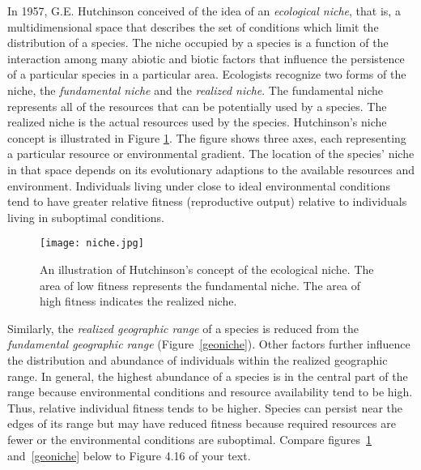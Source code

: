 \documentclass[11pt, hidelinks]{article}
\begin{document}
In 1957, G.E. Hutchinson conceived of the idea of an \emph{ecological niche}, that is, a multidimensional space that describes the set of conditions which limit the distribution of a species.  The niche occupied by a species is a function of the interaction among many abiotic and biotic factors that influence the persistence of a particular species in a particular area.  Ecologists recognize two forms of the niche, the \emph{fundamental niche} and the \emph{realized niche}. The fundamental niche represents all of the resources that can be potentially used by a species.  The realized niche is the actual resources used by the species. Hutchinson's niche concept is illustrated in Figure \ref{hutch niche}.  The figure shows three axes, each representing a particular resource or environmental gradient.  The location of the species' niche in that space depends on its evolutionary adaptions to the available resources and environment.  Individuals living under close to ideal environmental conditions tend to have greater relative fitness (reproductive output) relative to individuals living in suboptimal conditions.

\begin{figure}[htb]
	\centering
	\texttt{[image: niche.jpg]}
	\caption{An illustration of Hutchinson's concept of the ecological niche. The area of low fitness represents the fundamental niche. The area of high fitness indicates the realized niche. \label{hutch niche}}
\end{figure}

Similarly, the \emph{realized geographic range} of a species is reduced from the \emph{fundamental geographic range} (Figure~\ref{geoniche}). Other factors further influence the distribution and abundance of individuals within the realized geographic range. In general, the highest abundance of a species is in the central part of the range because environmental conditions and resource availability tend to be high. Thus, relative individual fitness tends to be higher.  Species can persist near the edges of its range but may have reduced fitness because required resources are fewer or the environmental conditions are suboptimal.  Compare figures~\ref{hutch niche} and~\ref{geoniche} below to Figure 4.16 of your text.  
\end{document}
